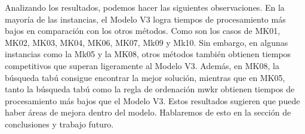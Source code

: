 Analizando los resultados, podemos hacer las siguientes observaciones. En la mayoría de 
las instancias, el Modelo V3 logra tiempos de procesamiento más bajos en comparación con 
los otros métodos. Como son los casos de MK01, MK02, MK03, MK04, MK06, MK07, Mk09 y Mk10.
Sin embargo, en algunas instancias como la Mk05 y la MK08, otros métodos también obtienen 
tiempos competitivos que superan ligeramente al Modelo V3. Además, en MK08, la búsqueda tabú 
consigue encontrar la mejor solución, mientras que en MK05, tanto la búsqueda tabú como la
regla de ordenación mwkr obtienen tiempos de procesamiento más bajos que el Modelo V3.
Estos resultados sugieren que puede haber áreas de mejora dentro del modelo. Hablaremos
de esto en la sección de conclusiones y trabajo futuro.